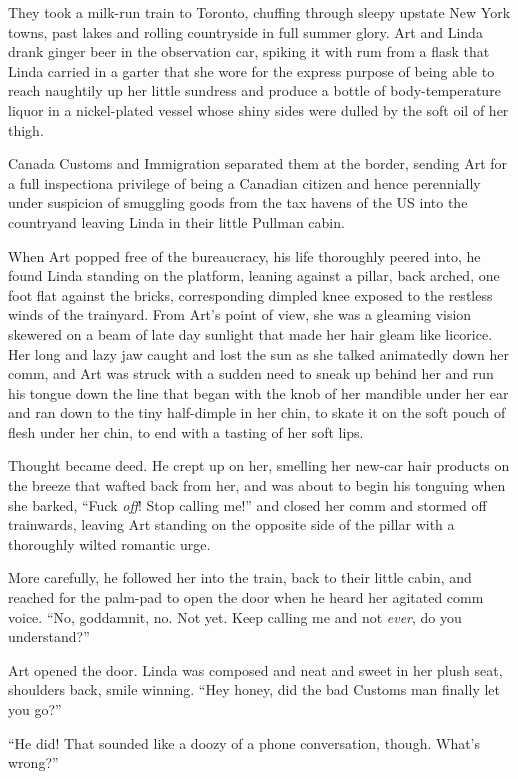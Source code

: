 They took a milk-run train to Toronto, chuffing through sleepy
upstate New York towns, past lakes and rolling countryside in full
summer glory. Art and Linda drank ginger beer in the observation
car, spiking it with rum from a flask that Linda carried in a
garter that she wore for the express purpose of being able to reach
naughtily up her little sundress and produce a bottle of
body-temperature liquor in a nickel-plated vessel whose shiny sides
were dulled by the soft oil of her thigh.

Canada Customs and Immigration separated them at the border,
sending Art for a full inspection{\dash}a privilege of being a Canadian
citizen and hence perennially under suspicion of smuggling goods
from the tax havens of the US into the country{\dash}and leaving Linda in
their little Pullman cabin.

When Art popped free of the bureaucracy, his life thoroughly peered
into, he found Linda standing on the platform, leaning against a
pillar, back arched, one foot flat against the bricks,
corresponding dimpled knee exposed to the restless winds of the
trainyard. From Art’s point of view, she was a gleaming vision
skewered on a beam of late day sunlight that made her hair gleam
like licorice. Her long and lazy jaw caught and lost the sun as she
talked animatedly down her comm, and Art was struck with a sudden
need to sneak up behind her and run his tongue down the line that
began with the knob of her mandible under her ear and ran down to
the tiny half-dimple in her chin, to skate it on the soft pouch of
flesh under her chin, to end with a tasting of her soft lips.

Thought became deed. He crept up on her, smelling her new-car hair
products on the breeze that wafted back from her, and was about to
begin his tonguing when she barked, “Fuck \emph{off}! Stop calling
me!” and closed her comm and stormed off trainwards, leaving Art
standing on the opposite side of the pillar with a thoroughly
wilted romantic urge.

More carefully, he followed her into the train, back to their
little cabin, and reached for the palm-pad to open the door when he
heard her agitated comm voice. “No, goddamnit, no. Not yet. Keep
calling me and not \emph{ever}, do you understand?”

Art opened the door. Linda was composed and neat and sweet in her
plush seat, shoulders back, smile winning. “Hey honey, did the bad
Customs man finally let you go?”

“He did! That sounded like a doozy of a phone conversation, though.
What’s wrong?”

